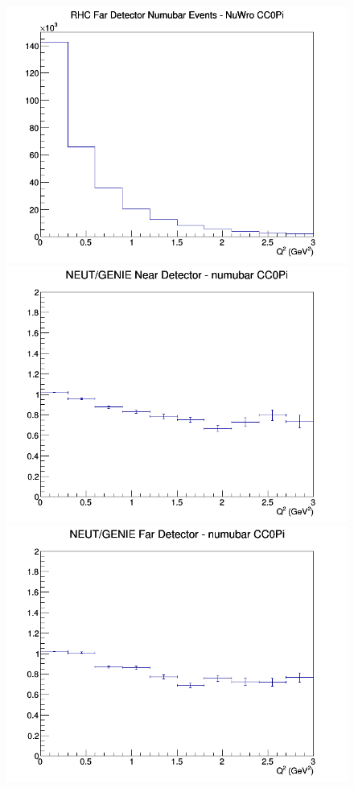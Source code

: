 \begin{figure}[h]
\endminipage
{}
\includegraphics[width=\linewidth]{eff_Q2/GAr/CC0Pi_RHC_FD_numubar_Q2_NuWro.png}
\endminipage
\newline
{}
\includegraphics[width=\linewidth]{eff_Q2/GAr/ratios/CC0Pi_NEUT_GENIE_numubar_near_Q2.png}
\endminipage
{}
\includegraphics[width=\linewidth]{eff_Q2/GAr/ratios/CC0Pi_NEUT_GENIE_numubar_far_Q2.png}

\end{figure}
